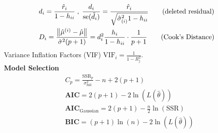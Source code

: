 \documentclass[letter, fleqn]{article}
\begin{document}
\begin{multicols}{3}
\begin{align*}
&d_i = \frac{\hat{r}_i}{1 - h_{ii}} \;,\; \frac{d_i}{\operatorname{se}(\tilde{d_i})} =  \frac{\hat{r}_i}{\sqrt{\hat{\sigma}^2_{(i)}1 - h_{ii}}} \tag{deleted residual}\\
&D_i = \frac{\norm{\hat{\mu}^{(i)} - \hat{\mu}}}{\hat{\sigma}^2(p+1)} =  d_i^2\frac{h_i}{1-h_{ii}}\cdot\frac{1}{p+1} \tag{Cook's Distance}
\end{align*}
Variance Inflation Factors (VIF) $\mathrm{VIF}_{i} = \frac{1}{1-R^2_j}$. 
\\
\textbf{Model Selection}
\begin{align*}
&C_p = \frac{\mathrm{SSR}_p}{\sigma^2_{\mathrm{full}}} - n + 2(p+1) \tag{Mallow’s $C_p$}\\
&\mathbf{AIC} = 2(p+1) - 2\ln(L(\hat{\theta})) \tag{Akaike’s IC}\\
&\mathbf{AIC}_{\text{Gaussian}} = 2(p+1) - \frac{n}{2}\ln(\mathrm{SSR}) \\
&\mathbf{BIC} = (p+1)\ln(n) - 2\ln(L(\hat{\theta})) \tag{Bayesian IC}
\end{align*}



































\end{multicols}
\end{document}
